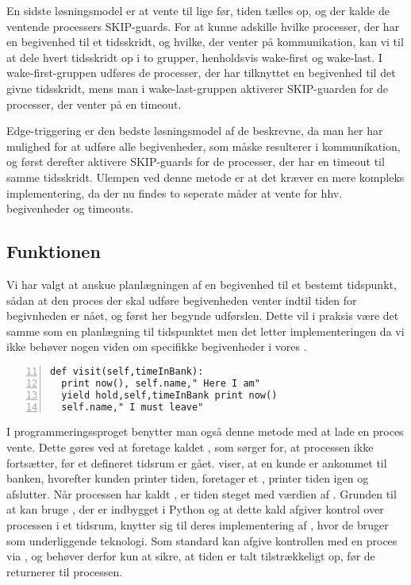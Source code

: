 En sidste løsningsmodel er at vente til lige før, tiden tælles op, og der kalde de ventende processers SKIP-guards. 
For at kunne adskille hvilke processer, der har en begivenhed til et tidsskridt, og hvilke, der venter på kommunikation, kan vi  til at dele hvert tidsskridt op i to grupper, henholdsvis wake-first og wake-last.
I wake-first-gruppen udføres de processer, der har tilknyttet en begivenhed til det givne tidsskridt, mens man i  wake-last-gruppen aktiverer SKIP-guarden for de processer, der venter på en timeout.

Edge-triggering er den bedste løsningsmodel af de beskrevne, da man her har mulighed for at udføre alle begivenheder, som måske resulterer i kommunikation, og først derefter aktivere SKIP-guards for de processer, der har en timeout til samme tidsskridt. Ulempen ved denne metode er at det kræver en mere kompleks implementering, da der nu findes to seperate måder at vente for hhv. begivenheder og timeouts.

\subsection{Funktionen }\label{sec:Wait}
Vi har valgt at anskue planlægningen af en begivenhed til et bestemt tidspunkt, sådan at den proces der skal udføre begivenheden venter indtil tiden for begivnheden er nået, og først her begynde udførslen. Dette vil i praksis være det samme som en planlægning til tidspunktet men det letter implementeringen da vi ikke behøver nogen viden om specifikke begivenheder i vores \sched. 

\begin{lstlisting}[firstnumber=11 , stepnumber=2, numbers=left,float=hbtp, label=fig:simpy:yield, caption= Et yield i \simpy (taget fra Bank05.py i eksemplet fra \simpy)] 
def visit(self,timeInBank): 
  print now(), self.name," Here I am" 
  yield hold,self,timeInBank print now()
  self.name," I must leave" 
\end{lstlisting}
I programmeringssproget \simpy benytter man også denne metode med at lade en proces vente. Dette gøres ved at
foretage kaldet , som sørger for, at processen ikke
fortsætter, før et defineret tidsrum er gået.  viser, at en kunde er ankommet til banken, hvorefter kunden printer tiden, foretager et , printer tiden igen og afslutter.  Når processen har kaldt , er tiden steget med værdien af . Grunden til at \simpy kan bruge , der er indbygget i Python og at dette kald afgiver kontrol over processen i et tidsrum, knytter sig til deres implementering af \simpy, hvor de bruger  som underliggende teknologi. Som standard kan   afgive kontrollen med en proces via , og \simpy behøver derfor kun at sikre, at tiden er talt tilstrækkeligt op, før de returnerer til processen.

